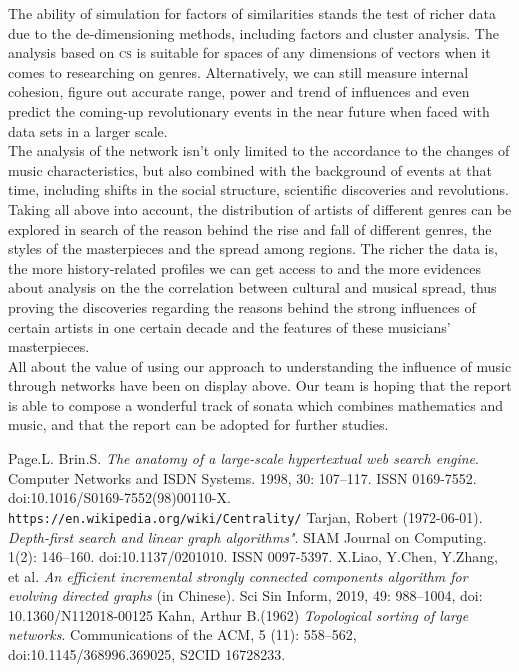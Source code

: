 \documentclass[12pt]{article}
\begin{document}
{The ability of simulation for factors of similarities stands the test of richer data due to the de-dimensioning methods, including factors and cluster analysis. The analysis based on \textsc{cs} is suitable for spaces of any dimensions of vectors when it comes to researching on genres. Alternatively, we can still measure internal cohesion, figure out accurate range, power and trend of influences and even predict the coming-up revolutionary events in the near future when faced with data sets in a larger scale.\\[1ex]
The analysis of the network isn't only limited to the accordance to the changes of music characteristics, but also combined with the background of events at that time, including shifts in the social structure, scientific discoveries and revolutions. Taking all above into account, the distribution of artists of different genres can be explored in search of the reason behind the rise and fall of different genres, the styles of the masterpieces and the spread among regions. The richer the data is, the more history-related profiles we can get access to and the more evidences about analysis on the the correlation between cultural and musical spread, thus proving the discoveries regarding the reasons behind the strong influences of certain artists in one certain decade and the features of these musicians' masterpieces.\\[2ex]
All about the value of using our approach to understanding the influence of music through networks have been on display above. Our team is hoping that the report is able to compose a wonderful track of sonata which combines mathematics and music, and that the report can be adopted for further studies.
\clearpage
\begin{thebibliography}{99}
	 Page.L. Brin.S. \emph{The anatomy of a large-scale hypertextual web search engine}. Computer Networks and ISDN Systems. 1998, 30: 107–117. ISSN 0169-7552. doi:10.1016/S0169-7552(98)00110-X. 
	 {{\texttt{https://en.wikipedia.org/wiki/Centrality/}}}
	 Tarjan, Robert (1972-06-01). \emph{Depth-first search and linear graph algorithms"}. SIAM Journal on Computing. 1(2): 146–160. doi:10.1137/0201010. ISSN 0097-5397.
	 X.Liao, Y.Chen, Y.Zhang, et al. \emph{An efficient incremental strongly connected components algorithm for evolving directed graphs} (in Chinese). Sci Sin Inform, 2019, 49: 988–1004, doi: 10.1360/N112018-00125
	 Kahn, Arthur B.(1962) \emph{Topological sorting of large networks}. Communications of the ACM, 5 (11): 558–562, doi:10.1145/368996.369025, S2CID 16728233.

\end{thebibliography}}
\end{document}
